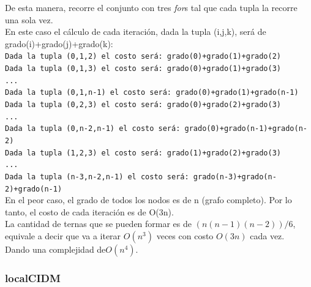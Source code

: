 De esta manera, recorre el conjunto con tres \emph{for}s tal que cada tupla la recorre una sola vez.\\

En este caso el c\'alculo de cada iteraci\'on, dada la tupla (i,j,k), ser\'a de grado(i)+grado(j)+grado(k):\\

\texttt{Dada la tupla (0,1,2) el costo ser\'a: grado(0)+grado(1)+grado(2)}\\

\texttt{Dada la tupla (0,1,3) el costo ser\'a: grado(0)+grado(1)+grado(3)}\\

\texttt{...}\\

\texttt{Dada la tupla (0,1,n-1) el costo ser\'a: grado(0)+grado(1)+grado(n-1)}\\

\texttt{Dada la tupla (0,2,3) el costo ser\'a: grado(0)+grado(2)+grado(3)}\\

\texttt{...}\\

\texttt{Dada la tupla (0,n-2,n-1) el costo ser\'a: grado(0)+grado(n-1)+grado(n-2)}\\

\texttt{Dada la tupla (1,2,3) el costo ser\'a: grado(1)+grado(2)+grado(3)}\\

\texttt{...}\\

\texttt{Dada la tupla (n-3,n-2,n-1) el costo ser\'a: grado(n-3)+grado(n-2)+grado(n-1)}\\

\bigskip
En el peor caso, el grado de todos los nodos es de n (grafo completo). Por lo tanto, el costo de cada iteraci\'on es de O(3n).\\

La cantidad de ternas que se pueden formar es de $(n(n-1)(n-2))/6$, equivale a decir que va a iterar $O(n^3)$ veces con costo $O(3n)$ cada vez.\\

Dando una complejidad de\textbf{$O(n^4)$}.

\newpage
\subsubsection{localCIDM}

